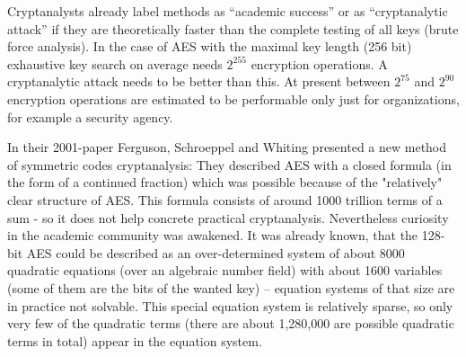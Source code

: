 Cryptanalysts already label methods as ``academic success'' or as ``cryptanalytic attack'' if they are theoretically faster than the complete testing of all keys (brute force analysis). In the case of AES with the maximal key length (256 bit) exhaustive key search on average needs $2^{255}$ encryption operations. A cryptanalytic attack needs to be better than this. At present between $2^{75}$ and $2^{90}$ encryption operations are estimated to be performable only just for organizations, for example a security agency.

In their 2001-paper Ferguson, Schroeppel and Whiting \cite{cm:Ferguson2001}
presented a new method of symmetric codes cryptanalysis: They described AES with
a closed formula (in the form of a continued fraction) which was possible
because of the "relatively" clear structure of AES. This formula consists of
around 1000 trillion terms of a sum - so it does not help concrete practical
cryptanalysis. Nevertheless curiosity in the academic community was awakened.
It was already known, that the 128-bit AES could be described as an
over-determined system of about 8000 quadratic equations (over an algebraic
number field) with about 1600 variables (some of them are the bits of the wanted
key) -- equation systems of that size are in practice not solvable. This special
equation system is relatively sparse, so only very few of the quadratic terms
(there are about 1,280,000 are possible quadratic terms in total) appear in the
equation system.

